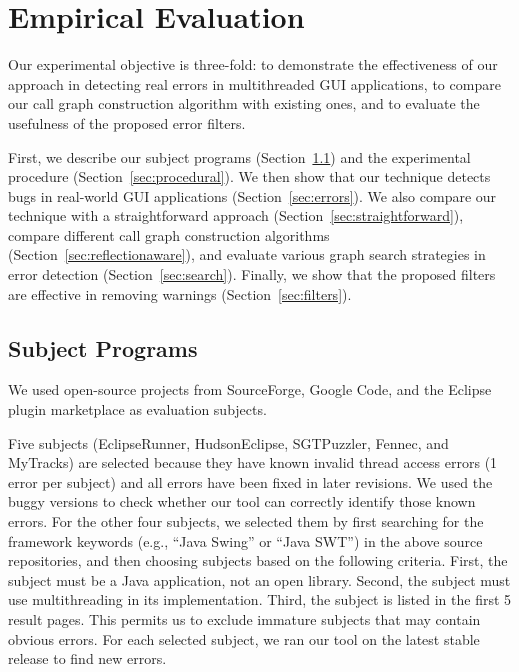 
\tinystep
\section{Empirical Evaluation}
\label{sec:evaluation}

Our experimental objective is three-fold: to demonstrate the effectiveness
of our approach in detecting real errors in multithreaded GUI applications, to 
compare our call graph construction algorithm
with existing ones, and to evaluate the usefulness of the proposed 
error filters.  

First, we describe our subject programs (Section~\ref{sec:subjects}) and the experimental procedure (Section~\ref{sec:procedural}).
We then show that our technique detects bugs in real-world GUI applications (Section~\ref{sec:errors}).
We also compare our technique with
a straightforward approach (Section~\ref{sec:straightforward}),  compare
different call graph construction algorithms (Section~\ref{sec:reflectionaware}), and
evaluate various graph search strategies in error detection (Section~\ref{sec:search}).
 Finally, we show that the proposed filters are effective
in removing warnings (Section~\ref{sec:filters}). 



\subsection{Subject Programs}
\label{sec:subjects}

We used \subnum open-source projects from SourceForge, Google Code,
and the Eclipse plugin marketplace as evaluation subjects. 

Five subjects (EclipseRunner, HudsonEclipse, SGTPuzzler, Fennec, and MyTracks)
are selected because they have known invalid thread access errors (1 error per subject) and
all errors have been fixed in later revisions.
We used the buggy versions to check whether our tool
can correctly identify those known errors. 
For the other four subjects, we selected them
by first searching for the
framework keywords (e.g., ``Java Swing'' or ``Java SWT'')
in the above source repositories, and then choosing subjects based on the following
criteria. First, the subject must be a Java application, not
an open library. Second, the subject must use multithreading in its implementation.
Third, the subject is listed in the first 5 result pages.
This permits us to exclude immature subjects that may contain obvious errors.
For each selected subject, we ran our tool on the latest stable release to find new errors.

